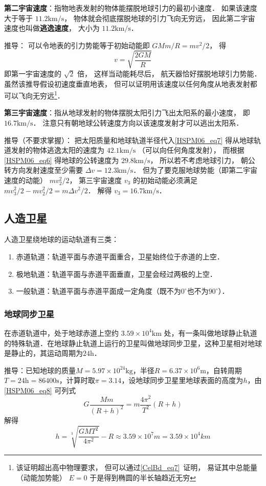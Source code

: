 \textbf{第二宇宙速度}：指物地表发射的物体能摆脱地球引力的最初小速度． 如果该速度大于等于 $11.2\mathrm{km/s}$， 物体就会彻底摆脱地球的引力飞向无穷远， 因此第二宇宙速度也叫做\textbf{逃逸速度}， 大小为 $11.2\mathrm{km/s}$．

推导： 可以令地表的引力势能等于初始动能即 $GMm/R = mv^2/2$， 得
\begin{equation}\label{HSPM06_eq7}
v = \sqrt{\frac{2GM}{R}}
\end{equation}
即第一宇宙速度的 $\sqrt{2}$ 倍， 这样当动能耗尽后， 航天器恰好摆脱地球引力势能． 虽然该推导假设初速度垂直地表， 但可以证明用该速度以任何角度从地表发射都可以飞向无穷远\footnote{该证明超出高中物理要求， 但可以通过\autoref{CelBd_eq7}~证明， 易证其中总能量（动能加势能） $E = 0$ 于是得到椭圆的半长轴趋近无穷}．

\textbf{第三宇宙速度}：指从地球发射的物体摆脱太阳引力飞出太阳系的最小速度， 即 $16.7\mathrm{km/s}$． 注意只有朝地球公转速度方向以该速度发射才可以逃出太阳系．

推导（不要求掌握）： 把太阳质量和地球轨道半径代入\autoref{HSPM06_eq7} 得从地球轨道发射的物体逃逸太阳的速度为 $42.1\mathrm{km/s}$ （可以向任何角度发射）， 而根据\autoref{HSPM06_eq6} 得地球的公转速度为 $29.8\mathrm{km/s}$， 所以若不考虑地球引力， 朝公转方向发射速度至少需要 $\Delta v = 12.3\mathrm{km/s}$． 但为了要克服地球势能（即第二宇宙速度的动能） $mv_2^2/2$， 第三宇宙速度 $v_3$ 的初始动能必须满足 $mv_3^2/2 - mv_2^2/2 = m\Delta v^2/2$． 解得 $v_3 = 16.7\mathrm{km/s}$．

\subsection{人造卫星}

人造卫星绕地球的运动轨道有三类：

\begin{enumerate}
\item 赤道轨道：轨道平面与赤道平面重合，卫星始终位于赤道的上空．
\item 极地轨道：轨道平面与赤道平面垂直，卫星会经过两极的上空．
\item 一般轨道：轨道平面与赤道平面成一定角度（既不为$0^\circ$也不为$90^\circ$）．
\end{enumerate}

\subsubsection{地球同步卫星}

在赤道轨道中，处于地球赤道上空约 $3.59\times10^4\mathrm{km}$ 处，有一条叫做地球静止轨道的特殊轨道．在地球静止轨道上运行的卫星叫做地球同步卫星，这种卫星相对地球是静止的，其运动周期为$24\mathrm{h}$．

推导：已知地球的质量$M=5.97\times10^{24}\mathrm{kg}$，半径$R=6.37\times10^6\mathrm{m}$，自转周期$T=24\mathrm{h}=86400\mathrm{s}$，计算时取$\pi=3.14$，设地球同步卫星里地球表面的高度为$h$，由\autoref{HSPM06_eq8} 可列式
\begin{equation}
G\frac{Mm}{(R+h)^2}= m\frac{4\pi^2}{T^2}(R+h)
\end{equation}
解得
\begin{equation}
h=\sqrt[3]{\frac{GMT^2}{4\pi^2}}-R \approx 3.59\times10^7m=3.59\times10^4km
\end{equation}
